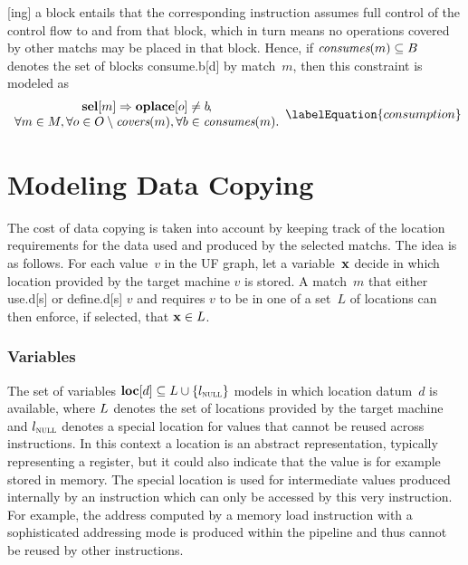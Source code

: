 [ing] a \gls{block} entails that the corresponding
\gls{instruction} assumes full control of the control flow to and from that
\gls{block}, which in turn means no \glspl{operation} covered by other
\glspl{match} may be placed in that \gls{block}.
%
Hence, if \mbox{$\operatorname{\textit{consumes}}(m) \subseteq B$} denotes the set of \glspl{block}
\gls{consume.b}[d] by \gls{match}~$m$, then this constraint is modeled as
%
\begin{equation}
  \begin{array}{c}
    \mVar{sel}[m]
    \mImp
    \mVar{oplace}[o] \neq b\hspace{-1.2pt}, \\
    \forall m \in \mMatchSet,
    \forall o \in \mOpSet \setminus \mCovers(m),
    \forall b \in \mConsumes(m).
  \end{array}
  \labelEquation{consumption}
\end{equation}


\section{Modeling Data Copying}

The cost of \gls{data copying} is taken into account by keeping track of the
location requirements for the data used and produced by the selected
\glspl{match}.
%
The idea is as follows.
%
For each value~$v$ in the \gls{UF graph}, let a \gls{variable}~$\mVar{x}$ decide
in which location provided by the \gls{target machine} $v$ is stored.
%
A \gls{match}~$m$ that either \gls{use.d}[s] or \gls{define.d}[s] $v$ and
requires $v$ to be in one of a set~$L$ of locations can then enforce, if
selected, that \mbox{$\mVar{x} \in L$}.


\subsubsection{Variables}

The set of \glspl{variable} \mbox{$\mVar{loc}[d] \subseteq \mLocationSet \cup
  \mSet{\mNullLocation}$} models in which location \gls{datum}~$d$ is available,
where $L$ denotes the set of locations provided by the \gls{target
  machine} and $l_\textsc{null}$ denotes a special location for values that
cannot be reused across \glspl{instruction}.
%
In this context a location is an abstract representation, typically representing
a \gls{register}, but it could also indicate that the value is for example
stored in memory.
%
The special location is used for intermediate values produced internally by an
\gls{instruction} which can only be accessed by this very \gls{instruction}.
%
For example, the address computed by a memory load \gls{instruction} with a
sophisticated addressing mode is produced within the pipeline and thus cannot be
reused by other \glspl{instruction}.


